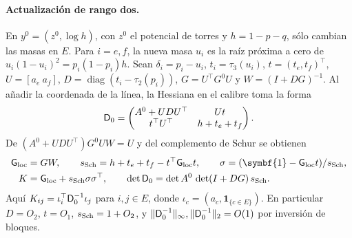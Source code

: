 \paragraph{Actualización de rango dos.}
En $y^0=(z^0,\log h)$, con $z^0$ el potencial de torres y $h=1-p-q$, sólo cambian
las masas en $E$. Para $i=e,f$, la nueva masa $u_i$ es la raíz próxima a cero de
$u_i(1-u_i)^2=p_i(1-p_i)h$. Sean $\delta_i=p_i-u_i$, $t_i=\tau_3(u_i)$,
$t=(t_e,t_f)^\top$, $U=[a_e\ a_f]$, $D=\operatorname{diag}(t_i-\tau_2(p_i))$,
$G=U^\top G^0U$ y $W=(I+DG)^{-1}$. Al añadir la coordenada de la línea, la Hessiana
en el calibre toma la forma
\[
 \mathsf D_0=\begin{pmatrix} A^0+UDU^\top & Ut\\ t^\top U^\top & h+t_e+t_f\end{pmatrix}.
\]
De $(A^0+UDU^\top)G^0UW=U$ y del complemento de Schur se obtienen
\begin{align*}
 \resloc&=GW,\qquad \schurloc=h+t_e+t_f-t^\top \resloc{}t,\qquad \sigma=(\symbf{1}-\resloc{}t)/\schurloc,\\
 K&=\resloc+\schurloc\sigma\sigma^\top,\qquad \det \hessloc_0=\det A^0\,\det(I+DG)\,\schurloc .
\end{align*}
Aquí $K_{ij}=\iota_i^\top \mathsf D_0^{-1}\iota_j$ para $i,j\in E$, donde
$\iota_c=(a_c,\symbf{1}_{\{c\in E\}})$. En particular $D=O_2$, $t=O_1$,
$s_{\mathrm{Sch}}=1+O_2$, y $\|\mathsf D_0^{-1}\|_\infty,\|\mathsf D_0^{-1}\|_2=O(1)$ por inversión de bloques.
